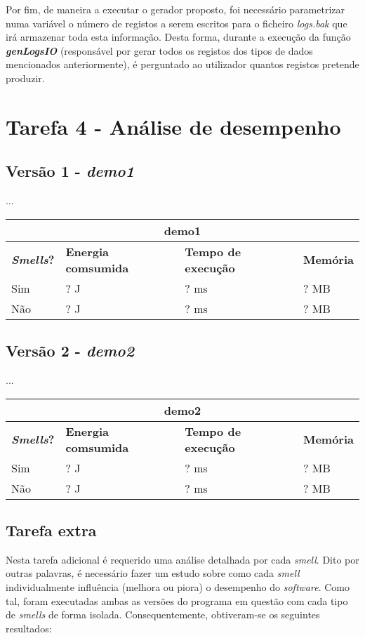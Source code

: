 \documentclass[a4paper]{report}
\begin{document}
Por fim, de maneira a executar o gerador proposto, foi necessário parametrizar numa variável o número de registos a serem escritos para o ficheiro \textit{logs.bak} que irá armazenar toda esta informação. Desta forma, durante a execução da função \textbf{\textit{genLogsIO}} (responsável por gerar todos os registos dos tipos de dados mencionados anteriormente), é perguntado ao utilizador quantos registos pretende produzir.

\section{Tarefa 4 - Análise de desempenho}
\subsection{Versão 1 - \textit{demo1}}
...

\begin{center}
    \begin{tabular}{ | l | l | l | l | }
    \hline  
    \multicolumn{4}{|c|}{\textbf{demo1}} \\
    \hline
    \textbf{\textit{Smells}?} & \textbf{Energia comsumida} & \textbf{Tempo de execução} & \textbf{Memória} \\ \hline
    Sim & ? J & ? ms & ? MB \\ \hline
    Não & ? J & ? ms & ? MB \\ \hline
    \end{tabular}
\end{center}

\subsection{Versão 2 - \textit{demo2}}
...

\begin{center}
    \begin{tabular}{ | l | l | l | l | }
    \hline  
    \multicolumn{4}{|c|}{\textbf{demo2}} \\
    \hline
    \textbf{\textit{Smells}?} & \textbf{Energia comsumida} & \textbf{Tempo de execução} & \textbf{Memória} \\ \hline
    Sim & ? J & ? ms & ? MB \\ \hline
    Não & ? J & ? ms & ? MB \\ \hline
    \end{tabular}
\end{center}

\subsection{Tarefa extra}
Nesta tarefa adicional é requerido uma análise detalhada por cada \textit{smell}. Dito por outras palavras, é necessário fazer um estudo sobre como cada \textit{smell} individualmente influência (melhora ou piora) o desempenho do \textit{software}. 
Como tal, foram executadas ambas as versões do programa em questão com cada tipo de \textit{smells} de forma isolada. Consequentemente, obtiveram-se os seguintes resultados:
\end{document}
